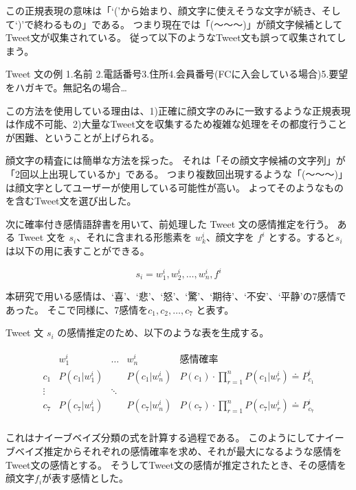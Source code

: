 \documentclass[11pt,a4j]{jsarticle}
\begin{document}
  この正規表現の意味は「`('から始まり、顔文字に使えそうな文字が続き、そして`)'で終わるもの」である。
  つまり現在では「(～～～)」が顔文字候補としてTweet文が収集されている。
  従って以下のようなTweet文も誤って収集されてしまう。
  \begin{itembox}{Tweet 文の例}
  1.名前 2.電話番号3.住所4.会員番号(FCに入会している場合)5.要望をハガキで。無記名の場合…
  \end{itembox}

  この方法を使用している理由は、1)正確に顔文字のみに一致するような正規表現は作成不可能、2)大量なTweet文を収集するため複雑な処理をその都度行うことが困難、ということが上げられる。

  顔文字の精査には簡単な方法を採った。
  それは「その顔文字候補の文字列」が「2回以上出現しているか」である。
  つまり複数回出現するような「(～～～)」は顔文字としてユーザーが使用している可能性が高い。
  よってそのようなものを含むTweet文を選び出した。

  
  次に確率付き感情語辞書を用いて、前処理した Tweet 文の感情推定を行う。
ある Tweet 文を $s_i$、それに含まれる形態素を $w^i_k$、顔文字を $f^i$ とする。すると$s_i$は以下の用に表すことができる。

\[
s_i=w^i_1,w^i_2,\ldots,w_n^i,f^i
\]

本研究で用いる感情は、`喜'、`悲'、`怒'、`驚'、`期待'、`不安'、`平静'の7感情であった。
そこで同様に、7感情を$c_1, c_2, \ldots, c_7$ と表す。

Tweet 文 $s_i$ の感情推定のため、以下のような表を生成する。

\begin{eqnarray*}
  \begin{array}{r|ccc|l}
        & w^i_1        & \ldots          & w^{i}_{n}    & 感情確率 \\ \hline
    c_1 & P(c_1|w^i_1) &                 & P(c_1|w^i_n) & P(c_1) \cdot \prod_{r=1}^{n}P(c_1|w^i_r) \doteq P^i_{c_1}\\
 \vdots &              & \ddots          &              & \\
    c_7 & P(c_7|w^i_1) &                 & P(c_7|w^i_n) & P(c_7) \cdot \prod_{r=1}^{n}P(c_7|w^i_r) \doteq P^i_{c_7}\\
  \end{array}
\end{eqnarray*}

これはナイーブベイズ分類の式を計算する過程である。
このようにしてナイーブベイズ推定からそれぞれの感情確率を求め、それが最大になるような感情をTweet文の感情とする。
そうしてTweet文の感情が推定されたとき、その感情を顔文字$f_i$が表す感情とした。
\end{document}
